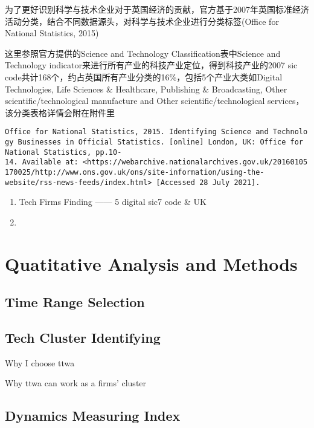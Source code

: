\documentclass[
  12pt,
  oneside]{book}
\providecommand{\tightlist}{%
  \setlength{\itemsep}{0pt}\setlength{\parskip}{0pt}}
\begin{document}
为了更好识别科学与技术企业对于英国经济的贡献，官方基于2007年英国标准经济活动分类，结合不同数据源头，对科学与技术企业进行分类标签(Office for National Statistics, 2015)

这里参照官方提供的Science and Technology Classification表中Science and Technology indicator来进行所有产业的科技产业定位，得到科技产业的2007 sic code共计168个，约占英国所有产业分类的16\%，包括5个产业大类如Digital Technologies, Life Sciences \& Healthcare, Publishing \& Broadcasting, Other scientific/technological manufacture and Other scientific/technological services，该分类表格详情会附在附件里

\texttt{Office\ for\ National\ Statistics,\ 2015.\ Identifying\ Science\ and\ Technology\ Businesses\ in\ Official\ Statistics.\ {[}online{]}\ London,\ UK:\ Office\ for\ National\ Statistics,\ pp.10-14.\ Available\ at:\ \textless{}https://webarchive.nationalarchives.gov.uk/20160105170025/http://www.ons.gov.uk/ons/site-information/using-the-website/rss-news-feeds/index.html\textgreater{}\ {[}Accessed\ 28\ July\ 2021{]}.}

\begin{enumerate}
\def\labelenumi{\arabic{enumi}.}
\tightlist
\item
  Tech Firms Finding ------ 5 digital sic7 code \& UK
\item
\end{enumerate}

\hypertarget{quatitative-analysis-and-methods}{%
\section{Quatitative Analysis and Methods}\label{quatitative-analysis-and-methods}}

\hypertarget{time-range-selection}{%
\subsection{Time Range Selection}\label{time-range-selection}}

\hypertarget{tech-cluster-identifying}{%
\subsection{Tech Cluster Identifying}\label{tech-cluster-identifying}}

Why I choose ttwa

Why ttwa can work as a firms' cluster

\hypertarget{dynamics-measuring-index}{%
\subsection{Dynamics Measuring Index}\label{dynamics-measuring-index}}
\end{document}
